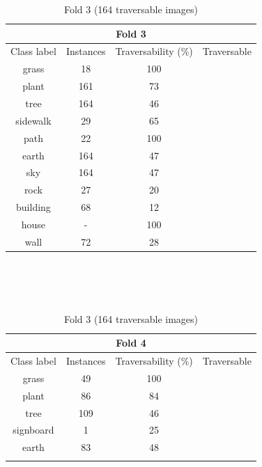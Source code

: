\documentclass[12pt,a4paper,table,dvipsnames,tikz]{report}
\begin{document}
	\begin{table}[h!]
		\ContinuedFloat %
		\begin{subtable}[h!]{\textwidth}
			\centering
			\begin{tabular}{|c|c|c|c|}
				\hline
				\multicolumn{4}{|c|}{Fold 3}\\
				\hline
				Class label & Instances & Traversability (\%) & Traversable\\
				\hline\hline
				grass & 18 & 100 & \checkmark\\
				\hline
				plant & 161 & 73 & \checkmark\\
				\hline
				\rowcolor{tree}
				tree & 164 & 46 &\\
				\hline
				sidewalk & 29 & 65 & \checkmark\\
				\hline
				path & 22 & 100 & \checkmark\\
				\hline
				\rowcolor{earth}
				earth & 164 & 47 &\\
				\hline
				\rowcolor{sky}
				sky & 164 & 47 &\\
				\hline
				rock & 27 & 20 &\\
				\hline
				building & 68 & 12 &\\
				\hline
				\rowcolor{house}
				house & - & 100 & \checkmark\\
				\hline
				wall & 72 & 28 &\\
				\hline
			\end{tabular}
			\caption{Fold 3 (164 traversable images)}
			\label{table:trav.f3}
		\end{subtable}
		\\\\\\
		\begin{subtable}[h!]{\textwidth}
			\centering
			\begin{tabular}{|c|c|c|c|}
				\hline
				\multicolumn{4}{|c|}{Fold 4}\\
				\hline
				Class label & Instances & Traversability (\%) & Traversable\\
				\hline\hline
				grass & 49 & 100 & \checkmark\\
				\hline
				plant & 86 & 84 & \checkmark\\
				\hline
				\rowcolor{tree}
				tree & 109 & 46 &\\
				\hline
				signboard & 1 & 25 &\\
				\hline
				\rowcolor{earth}
				earth & 83 & 48 &\\
				\hline
				\rowcolor{sky}

\end{tabular}
\end{subtable}
\end{table}
\end{document}
